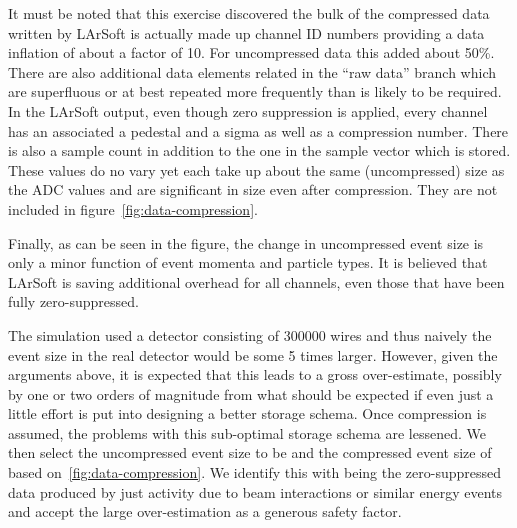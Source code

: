 It must be noted that this exercise discovered the bulk of the
compressed data written by LArSoft is actually made up channel ID
numbers providing a data inflation of about a factor of 10.
For uncompressed data this added about 50\%.
There are also additional data elements related in the ``raw data''
branch which are superfluous or at best repeated more frequently than
is likely to be required.
In the LArSoft output, even though zero suppression is applied, every
channel has an associated a pedestal and a sigma as well as a
compression number.
There is also a sample count in addition to the one in the sample
vector which is stored.
These values do no vary yet each take up about the same (uncompressed)
size as the ADC values and are significant in size even after
compression.
They are not included in figure~\ref{fig:data-compression}.

Finally, as can be seen in the figure, the change in uncompressed
event size is only a minor function of event momenta and particle types.
It is believed that LArSoft is saving additional overhead for all
channels, even those that have been fully zero-suppressed.

The simulation used a detector consisting of \num{300000} wires and
thus naively the event size in the real detector would be some 5 times
larger.
However, given the arguments above, it is expected that this leads to
a gross over-estimate, possibly by one or two orders of magnitude from
what should be expected if even just a little effort is put into
designing a better storage schema.
Once compression is assumed, the problems with this sub-optimal
storage schema are lessened.
We then select the uncompressed event size to be \beameventsize and
the compressed event size of \beameventsizecompressed based
on~\ref{fig:data-compression}.
We identify this with being the zero-suppressed data produced by just
activity due to beam interactions or similar energy events and accept
the large over-estimation as a generous safety factor.






